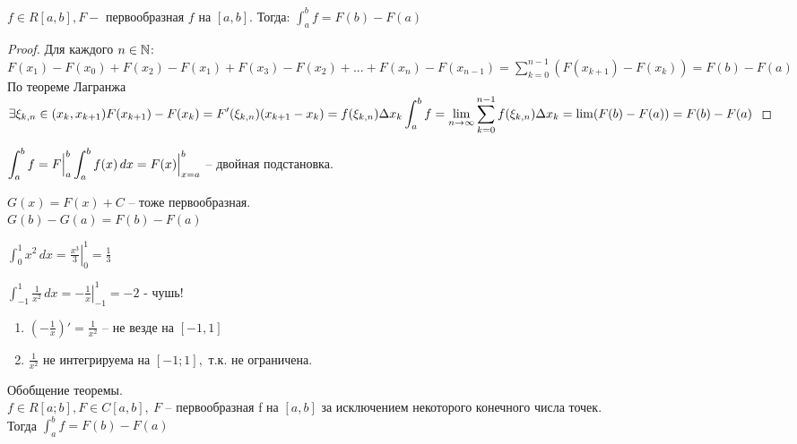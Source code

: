 \begin{Thm} 
	$f \in R[a,b], F -$ первообразная $f$ на $[a,b]$. Тогда: $\displaystyle \int_{a}^{b} f = F(b) - F(a)$
\end{Thm} 

\begin{proof}
	Для каждого $n \in \mathbb{N}$:\\ %
	$\displaystyle F(x_1) - F(x_0) + F(x_2) - F(x_1) + F(x_3) - F(x_2) + ... + F(x_n) - F(x_{n-1}) = 
	\sum_{k=0}^{n-1} (F(x_{k+1}) - F(x_k)) = F(b) - F(a)$\\
	По теореме Лагранжа $\displaystyle \exists \xi_{k,n} \in (x_k, x_{k+1})\\ F(x_{k+1}) - F(x_k) = F'(\xi_{k, n})(x_{k+1} - x_k) =
	f(\xi_{k,n}) \Delta x_k\\
	\int_{a}^{b} f = \lim_{n \to \infty} \sum_{k=0}^{n-1} f(\xi_{k, n}) \Delta x_k = \lim (F(b) - F(a)) = F(b) - F(a)$
\end{proof}

\begin{Rem}
	$\displaystyle \int_{a}^{b} f = F \Big|^b_a\\
	\int_{a}^{b} f(x)\,dx = F(x) \Big|^b_{x = a}$ -- двойная подстановка.
\end{Rem}

\begin{Rem}
	$G(x) = F(x) + C$ -- тоже первообразная.\\
	$G(b) - G(a) = F(b) - F(a)$
\end{Rem}

\begin{Example}
	$\displaystyle \int_{0}^{1} x^2 \,dx = \left. \frac{x^3}{3} \right|^1_0 = \frac{1}{3}$
\end{Example}

\begin{Example}
	$\displaystyle \int_{-1}^{1} \frac{1}{x^2} \,dx = - \left. \frac{1}{x} \right|^1_{-1} = -2$ - чушь!
	\begin{enumerate}
		\item $\left(-\frac{1}{x}\right)' = \frac{1}{x^2}$ -- не везде на $[-1,1]$
		\item $\frac{1}{x^2}$ не интегрируема на $[-1; 1], $ т.к. не ограничена.
	\end{enumerate}
\end{Example}

\begin{Remark}
	Обобщение теоремы.\\
	$f \in R[a; b], F \in C[a,b], \ F$ -- первообразная f на $[a,b]$ за исключением некоторого конечного числа точек.\\
	Тогда $\displaystyle \int_{a}^{b} f	= F(b) - F(a)$
\end{Remark}

